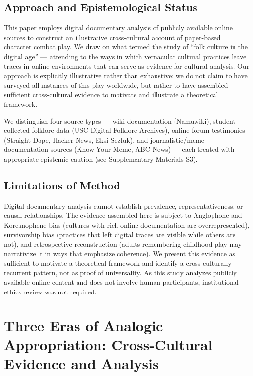 \documentclass[12pt]{article}
\begin{document}
\subsection{Approach and Epistemological Status}

This paper employs digital documentary analysis of publicly available online sources to construct an illustrative cross-cultural account of paper-based character combat play. We draw on what \citet{blank2012} termed the study of ``folk culture in the digital age'' --- attending to the ways in which vernacular cultural practices leave traces in online environments that can serve as evidence for cultural analysis. Our approach is explicitly illustrative rather than exhaustive: we do not claim to have surveyed all instances of this play worldwide, but rather to have assembled sufficient cross-cultural evidence to motivate and illustrate a theoretical framework.

We distinguish four source types --- wiki documentation (Namuwiki), student-collected folklore data (USC Digital Folklore Archives), online forum testimonies (Straight Dope, Hacker News, Eksi Sozluk), and journalistic/meme-documentation sources (Know Your Meme, ABC News) --- each treated with appropriate epistemic caution (see Supplementary Materials S3).

\subsection{Limitations of Method}

Digital documentary analysis cannot establish prevalence, representativeness, or causal relationships. The evidence assembled here is subject to Anglophone and Koreanophone bias (cultures with rich online documentation are overrepresented), survivorship bias (practices that left digital traces are visible while others are not), and retrospective reconstruction (adults remembering childhood play may narrativize it in ways that emphasize coherence). We present this evidence as sufficient to motivate a theoretical framework and identify a cross-culturally recurrent pattern, not as proof of universality. As this study analyzes publicly available online content and does not involve human participants, institutional ethics review was not required.

\section{Three Eras of Analogic Appropriation: Cross-Cultural Evidence and Analysis}
\end{document}
